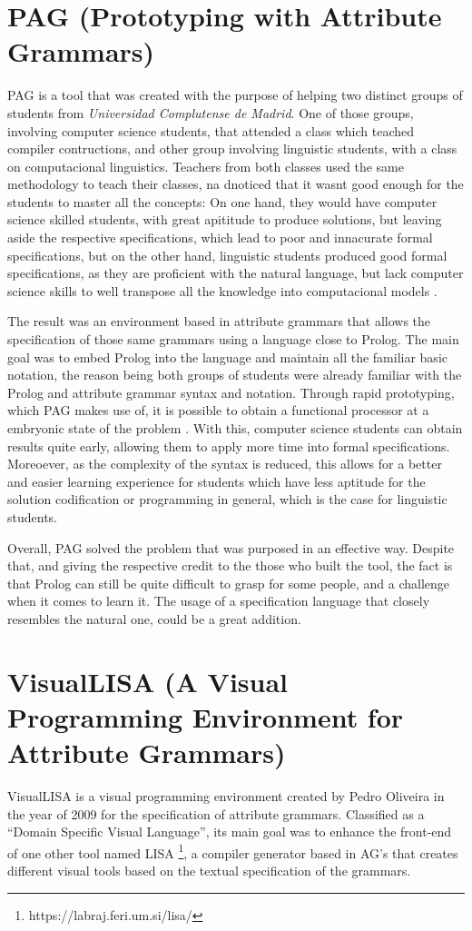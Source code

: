 \section{PAG  (Prototyping with Attribute Grammars)}
PAG is a tool that was created with the purpose of helping two distinct groups of students from \emph{Universidad Complutense de Madrid}. One of those groups, involving computer science students, that attended a class which teached compiler contructions, and other group involving linguistic students, with a class on computacional linguistics. Teachers from both classes used the same methodology to teach their classes, na dnoticed that it wasnt good enough for the students to master all the concepts: On one hand, they would have computer science skilled students, with great apititude to produce solutions, but leaving aside the respective specifications, which lead to poor and innacurate formal specifications, but on the other hand, linguistic students produced good formal specifications, as they are proficient with the natural language, but lack computer science skills to well transpose all the knowledge into computacional models \cite{sierra_2006}.
	
The result was an environment based in attribute grammars that allows the specification of those same grammars using a language close to Prolog. The main goal was to embed Prolog into the language and maintain all the familiar basic notation, the reason being both groups of students were already familiar with the Prolog and attribute grammar syntax and notation. Through rapid prototyping, which PAG makes use of, it is possible to obtain a functional processor at a embryonic state of the problem \cite{sierra_2006}. With this, computer science students can obtain results quite early, allowing them to apply more time into formal specifications. Moreoever, as the complexity of the syntax is reduced, this allows for a better and easier learning experience for students which have less aptitude for the solution codification or programming in general, which is the case for linguistic students.
	
Overall, PAG solved the problem that was purposed in an effective way. Despite that, and giving the respective credit to the those who built the tool, the fact is that Prolog can still be quite difficult to grasp for some people, and a challenge when it comes to learn it. The usage of a specification language that closely resembles the natural one, could be a great addition.
	
\section{VisualLISA (A Visual Programming Environment for Attribute Grammars)}
VisualLISA is a visual programming environment created by Pedro Oliveira in the year of 2009 \cite{oliveira_2009} for the specification of attribute grammars. Classified as a ``Domain Specific  Visual Language'', its main goal was to enhance the front-end of one other tool named LISA \footnote{https://labraj.feri.um.si/lisa/}, a compiler generator based in AG's that creates different visual tools based on the textual specification of the grammars.
    
